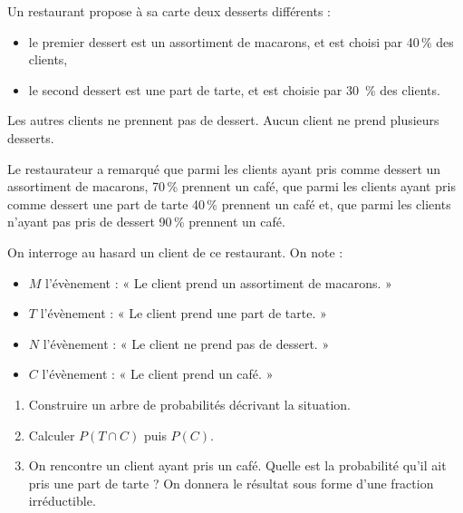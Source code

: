 \medskip

Un restaurant propose à sa carte deux desserts différents :
\begin{itemize}
\item  le premier dessert est un assortiment de macarons, et est choisi par 40\,\% des clients,
\item le second dessert est une part de tarte, et est choisie par 30 \,\% des clients.
\end{itemize}
Les autres clients ne prennent pas de dessert. Aucun client ne prend plusieurs desserts.

Le restaurateur a remarqué 
que parmi les clients ayant pris comme dessert un assortiment de macarons, 70\,\% prennent un café,
que parmi les clients ayant pris comme dessert une part de tarte 40\,\% prennent un café et,
que parmi les clients n’ayant pas pris de dessert 90\,\% prennent un café. 
 
On interroge au hasard un client de ce restaurant. On note :

\begin{itemize}
\item [*] $M$ l’évènement : « Le client prend un assortiment de macarons. »
\item [*] $T$ l’évènement : « Le client prend une part de tarte. »
\item [*] $N$ l’évènement : « Le client ne prend pas de dessert. »
\item [*]$C$ l’évènement : « Le client prend un café. »
\end{itemize}

\medskip

\begin{enumerate}
\item Construire un arbre de probabilités décrivant la situation.
\item Calculer $P(T\cap C)$  puis $P(C)$.
\item On rencontre un client ayant pris un café. Quelle est la probabilité qu’il ait pris une part de tarte ? On donnera le résultat sous forme d’une fraction irréductible.
\end{enumerate}

\vspace{0,5cm}
